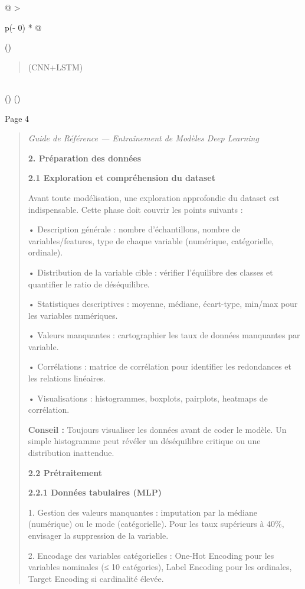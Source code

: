 \documentclass[
]{article}
\begin{document}
\begin{longtable}[]{@{}
  >{\raggedright\arraybackslash}p{(\columnwidth - 0\tabcolsep) * }@{}}
\toprule()
\begin{minipage}[b]{\linewidth}\raggedright
\begin{quote}
(CNN+LSTM)
\end{quote}
\end{minipage} \\
\midrule()
\endhead
\bottomrule()
\end{longtable}

Page 4

\begin{quote}
\emph{Guide de Référence --- Entraînement de Modèles Deep Learning}

\textbf{2. Préparation des données}

\textbf{2.1 Exploration et compréhension du dataset}

Avant toute modélisation, une exploration approfondie du dataset est
indispensable. Cette phase doit couvrir les points suivants :

• Description générale : nombre d'échantillons, nombre de
variables/features, type de chaque variable (numérique, catégorielle,
ordinale).

• Distribution de la variable cible : vérifier l'équilibre des classes
et quantifier le ratio de déséquilibre.

• Statistiques descriptives : moyenne, médiane, écart-type, min/max pour
les variables numériques.

• Valeurs manquantes : cartographier les taux de données manquantes par
variable.

• Corrélations : matrice de corrélation pour identifier les redondances
et les relations linéaires.

• Visualisations : histogrammes, boxplots, pairplots, heatmaps de
corrélation.

\textbf{Conseil :} Toujours visualiser les données avant de coder le
modèle. Un simple histogramme peut révéler un déséquilibre critique ou
une distribution inattendue.

\textbf{2.2 Prétraitement}

\textbf{2.2.1 Données tabulaires (MLP)}

1. Gestion des valeurs manquantes : imputation par la médiane
(numérique) ou le mode (catégorielle). Pour les taux supérieurs à 40\%,
envisager la suppression de la variable.

2. Encodage des variables catégorielles : One-Hot Encoding pour les
variables nominales (≤ 10 catégories), Label Encoding pour les
ordinales, Target Encoding si cardinalité élevée.


\end{quote}
\end{document}

